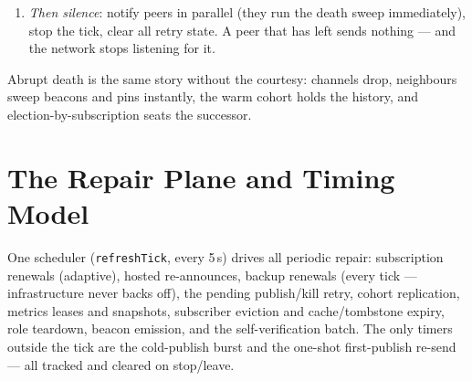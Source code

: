 \documentclass[nobib]{tufte-handout}
\begin{document}
\begin{enumerate}
  topic's last copy whenever the one send didn't land (40/40
  confirmation failures in the field). A topic still unacked after the
  rounds gets \emph{one} fallback \texttt{handoff} to the runner-up ---
  worst case two proper holders whose caches union --- and \emph{never}
  a \texttt{replicate}: acks are a race against load, so ``unacked''
  usually means ``acked late,'' and a departing node spraying replica
  state plants backups of a dead principal (the principal-liveness
  rule; violating it collapsed the backbone twice). \texttt{from} names
  the leaver so the heir purges the leaver's ghost beacon and never
  defers its new claim back to it.
\item \emph{Then silence}: notify peers in parallel (they run the death
  sweep immediately), stop the tick, clear all retry state. A peer that
  has left sends nothing --- and the network stops listening for it.
\end{enumerate}

Abrupt death is the same story without the courtesy: channels drop,
neighbours sweep beacons and pins instantly, the warm cohort holds the
history, and election-by-subscription seats the successor.

\section{The Repair Plane and Timing Model}\label{sec:timing}

One scheduler (\texttt{refreshTick}, every 5\,s) drives all periodic
repair: subscription renewals (adaptive), hosted re-announces, backup
renewals (every tick --- infrastructure never backs off), the pending
publish/kill retry, cohort replication, metrics leases and snapshots,
subscriber eviction and cache/tombstone expiry, role teardown, beacon
emission, and the self-verification batch. The only timers outside the
tick are the cold-publish burst and the one-shot first-publish re-send
--- all tracked and cleared on stop/leave.
\end{document}
